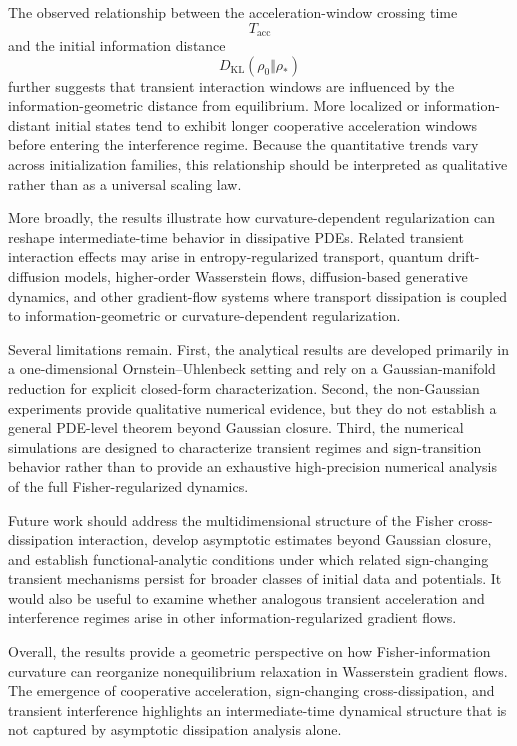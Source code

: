 \documentclass[aps,prl,twocolumn,10pt,superscriptaddress]{revtex4-2}
\begin{document}
The observed relationship between the acceleration-window crossing time
\[
T_{\mathrm{acc}}
\]
and the initial information distance
\[
D_{\mathrm{KL}}(\rho_0\Vert\rho_\ast)
\]
further suggests that transient interaction windows are influenced by the information-geometric distance from equilibrium. More localized or information-distant initial states tend to exhibit longer cooperative acceleration windows before entering the interference regime. Because the quantitative trends vary across initialization families, this relationship should be interpreted as qualitative rather than as a universal scaling law.

More broadly, the results illustrate how curvature-dependent regularization can reshape intermediate-time behavior in dissipative PDEs. Related transient interaction effects may arise in entropy-regularized transport, quantum drift-diffusion models, higher-order Wasserstein flows, diffusion-based generative dynamics, and other gradient-flow systems where transport dissipation is coupled to information-geometric or curvature-dependent regularization.

Several limitations remain. First, the analytical results are developed primarily in a one-dimensional Ornstein--Uhlenbeck setting and rely on a Gaussian-manifold reduction for explicit closed-form characterization. Second, the non-Gaussian experiments provide qualitative numerical evidence, but they do not establish a general PDE-level theorem beyond Gaussian closure. Third, the numerical simulations are designed to characterize transient regimes and sign-transition behavior rather than to provide an exhaustive high-precision numerical analysis of the full Fisher-regularized dynamics.

Future work should address the multidimensional structure of the Fisher cross-dissipation interaction, develop asymptotic estimates beyond Gaussian closure, and establish functional-analytic conditions under which related sign-changing transient mechanisms persist for broader classes of initial data and potentials. It would also be useful to examine whether analogous transient acceleration and interference regimes arise in other information-regularized gradient flows.

Overall, the results provide a geometric perspective on how Fisher-information curvature can reorganize nonequilibrium relaxation in Wasserstein gradient flows. The emergence of cooperative acceleration, sign-changing cross-dissipation, and transient interference highlights an intermediate-time dynamical structure that is not captured by asymptotic dissipation analysis alone.
\end{document}
